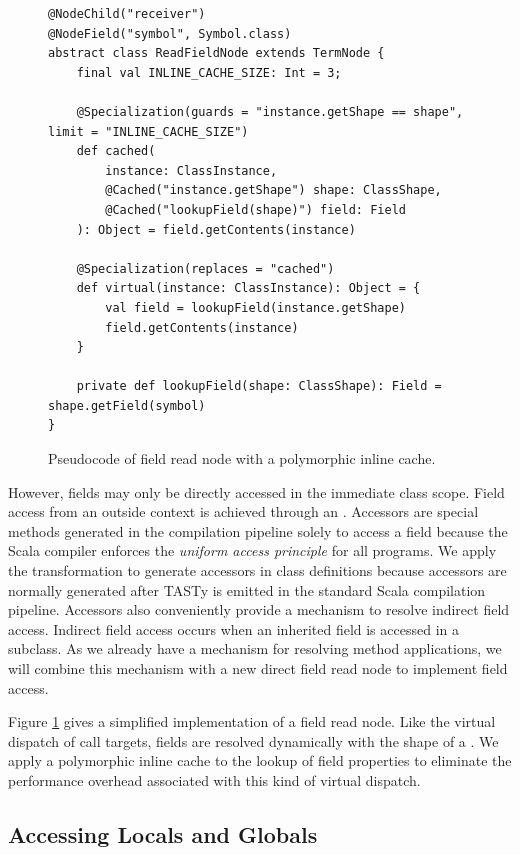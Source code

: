 \begin{figure}[!htb]
\begin{verbatim}
@NodeChild("receiver")
@NodeField("symbol", Symbol.class)
abstract class ReadFieldNode extends TermNode {
	final val INLINE_CACHE_SIZE: Int = 3;
		
	@Specialization(guards = "instance.getShape == shape", limit = "INLINE_CACHE_SIZE")
	def cached(
		instance: ClassInstance,
		@Cached("instance.getShape") shape: ClassShape,
		@Cached("lookupField(shape)") field: Field
	): Object = field.getContents(instance)
		
	@Specialization(replaces = "cached")
	def virtual(instance: ClassInstance): Object = {
		val field = lookupField(instance.getShape)
		field.getContents(instance)
	}

	private def lookupField(shape: ClassShape): Field = shape.getField(symbol)
}
\end{verbatim}
\caption{Pseudocode of field read node with a polymorphic inline cache.}
\label{impl:field-read-node}
\end{figure}

However, fields may only be directly accessed in the immediate class scope.
Field access from an outside context is achieved through an .
Accessors are special methods generated in the compilation pipeline solely to access a field because the Scala compiler enforces the \textit{uniform access principle}\cite{beyer:oo-construction} for all programs.
We apply the transformation to generate accessors in class definitions because accessors are normally generated after TASTy is emitted in the standard Scala compilation pipeline.
Accessors also conveniently provide a mechanism to resolve indirect field access.
Indirect field access occurs when an inherited field is accessed in a subclass.
As we already have a mechanism for resolving method applications, we will combine this mechanism with a new direct field read node to implement field access.

Figure \ref{impl:field-read-node} gives a simplified implementation of a field read node.
Like the virtual dispatch of call targets, fields are resolved dynamically with the shape of a .
We apply a polymorphic inline cache to the lookup of field properties to eliminate the performance overhead associated with this kind of virtual dispatch.

\subsection{Accessing Locals and Globals}

